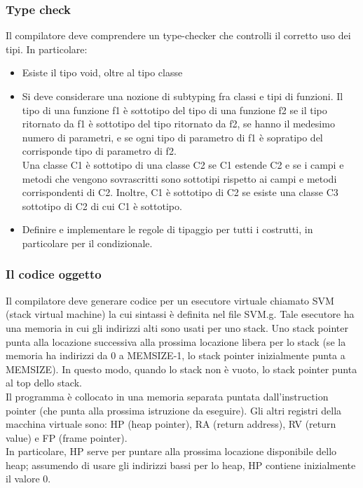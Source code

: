 \documentclass[a4paper]{article}   %
\begin{document}
\subsubsection{Type check}

Il compilatore deve comprendere un type-checker che controlli il corretto uso dei tipi.
In particolare:

\begin{itemize}
  \item Esiste il tipo void, oltre al tipo classe

  \item Si deve considerare una nozione di subtyping fra classi e tipi di funzioni. Il tipo
  di una funzione f1 è sottotipo del tipo di una funzione f2 se il tipo ritornato da f1
  è sottotipo del tipo ritornato da f2, se hanno il medesimo numero di parametri, e se
  ogni tipo di parametro di f1 è sopratipo del corrisponde tipo di parametro di f2.\\
  Una classe C1 è sottotipo di una classe C2 se C1 estende C2 e se i campi e metodi che
  vengono sovrascritti sono sottotipi rispetto ai campi e metodi corrispondenti di C2.
  Inoltre, C1 è sottotipo di C2 se esiste una classe C3 sottotipo di C2 di cui C1 è
  sottotipo.

  \item Definire e implementare le regole di tipaggio per tutti i costrutti, in
  particolare per il condizionale.
\end{itemize}

\subsubsection{Il codice oggetto}

Il compilatore deve generare codice per un esecutore virtuale chiamato SVM (stack
virtual machine) la cui sintassi è definita nel file SVM.g. Tale esecutore ha una
memoria in cui gli indirizzi alti sono usati per uno stack. Uno stack pointer punta alla
locazione successiva alla prossima locazione libera per lo stack (se la memoria ha
indirizzi da 0 a MEMSIZE-1, lo stack pointer inizialmente punta a MEMSIZE).
In questo modo, quando lo stack non è vuoto, lo stack pointer punta al top dello stack.\\

Il programma è collocato in una memoria separata puntata dall’instruction pointer
(che punta alla prossima istruzione da eseguire). Gli altri registri della macchina
virtuale sono: HP (heap pointer), RA (return address), RV (return value) e FP
(frame pointer).\\
In particolare, HP serve per puntare alla prossima locazione disponibile dello
heap; assumendo di usare gli indirizzi bassi per lo heap, HP contiene inizialmente
il valore 0.\\
\end{document}
